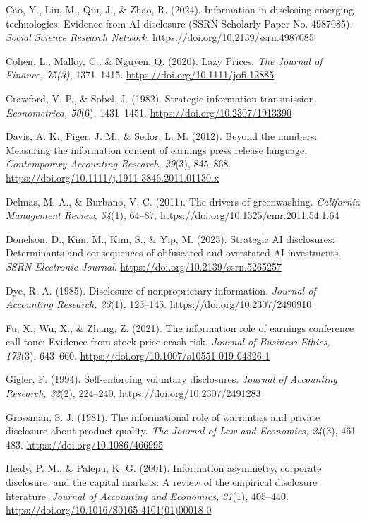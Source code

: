 Cao, Y., Liu, M., Qiu, J., \& Zhao, R. (2024). Information in disclosing emerging technologies: Evidence from AI disclosure (SSRN Scholarly Paper No. 4987085). \textit{Social Science Research Network}. \url{https://doi.org/10.2139/ssrn.4987085}

Cohen, L., Malloy, C., \& Nguyen, Q. (2020). Lazy Prices. \textit{The Journal of Finance, 75(3)}, 1371–1415. \url{https://doi.org/10.1111/jofi.12885}

Crawford, V. P., \& Sobel, J. (1982). Strategic information transmission. \textit{Econometrica, 50}(6), 1431--1451. \url{https://doi.org/10.2307/1913390}

Davis, A. K., Piger, J. M., \& Sedor, L. M. (2012). Beyond the numbers: Measuring the information content of earnings press release language. \textit{Contemporary Accounting Research, 29}(3), 845--868. \url{https://doi.org/10.1111/j.1911-3846.2011.01130.x}

Delmas, M. A., \& Burbano, V. C. (2011). The drivers of greenwashing. \textit{California Management Review, 54}(1), 64--87. \url{https://doi.org/10.1525/cmr.2011.54.1.64}

Donelson, D., Kim, M., Kim, S., \& Yip, M. (2025). Strategic AI disclosures: Determinants and consequences of obfuscated and overstated AI investments. \textit{SSRN Electronic Journal}. \url{https://doi.org/10.2139/ssrn.5265257}

Dye, R. A. (1985). Disclosure of nonproprietary information. \textit{Journal of Accounting Research, 23}(1), 123--145. \url{https://doi.org/10.2307/2490910}

Fu, X., Wu, X., \& Zhang, Z. (2021). The information role of earnings conference call tone: Evidence from stock price crash risk. \textit{Journal of Business Ethics, 173}(3), 643--660. \url{https://doi.org/10.1007/s10551-019-04326-1}

Gigler, F. (1994). Self-enforcing voluntary disclosures. \textit{Journal of Accounting Research, 32}(2), 224--240. \url{https://doi.org/10.2307/2491283}

Grossman, S. J. (1981). The informational role of warranties and private disclosure about product quality. \textit{The Journal of Law and Economics, 24}(3), 461--483. \url{https://doi.org/10.1086/466995}

Healy, P. M., \& Palepu, K. G. (2001). Information asymmetry, corporate disclosure, and the capital markets: A review of the empirical disclosure literature. \textit{Journal of Accounting and Economics, 31}(1), 405--440. \url{https://doi.org/10.1016/S0165-4101(01)00018-0}

